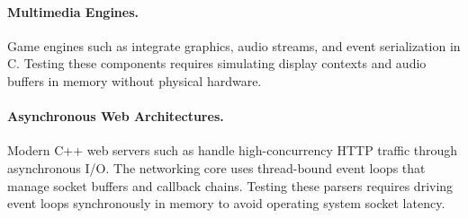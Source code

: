 \paragraph{Multimedia Engines.}
Game engines such as \raylib integrate graphics, audio streams, and event serialization in C.
Testing these components requires simulating display contexts and audio buffers in memory without physical hardware.

\paragraph{Asynchronous Web Architectures.}
Modern C++ web servers such as \drogon handle high-concurrency HTTP traffic through asynchronous I/O.
The networking core uses thread-bound event loops that manage socket buffers and callback chains.
Testing these parsers requires driving event loops synchronously in memory to avoid operating system socket latency.
